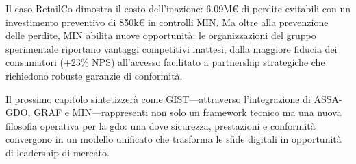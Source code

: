 Il caso RetailCo dimostra il costo dell'inazione: 6.09M€ di perdite evitabili con un investimento preventivo di 850k€ in controlli MIN. Ma oltre alla prevenzione delle perdite, MIN abilita nuove opportunità: le organizzazioni del gruppo sperimentale riportano vantaggi competitivi inattesi, dalla maggiore fiducia dei consumatori (+23\% NPS) all'accesso facilitato a partnership strategiche che richiedono robuste garanzie di conformità.

Il prossimo capitolo sintetizzerà come GIST—attraverso l'integrazione di ASSA-GDO, GRAF e MIN—rappresenti non solo un framework tecnico ma una nuova filosofia operativa per la \gls{gdo}: una dove sicurezza, prestazioni e conformità convergono in un modello unificato che trasforma le sfide digitali in opportunità di leadership di mercato.

\clearpage
\printbibliography[
    heading=subbibliography,
    title={Riferimenti Bibliografici del Capitolo 4},
]

